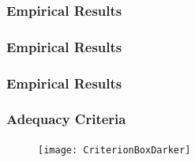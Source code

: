 \begin{frame}%
  \frametitle{Empirical Results}
  \framesubtitle{\mbox{}}
  \begin{center}


\end{center}
\end{frame}

\begin{frame}%
  \frametitle{Empirical Results}
  \framesubtitle{\mbox{}}
  \begin{center}


\end{center}
\end{frame}

\begin{frame}%
  \frametitle{Empirical Results}
  \framesubtitle{\mbox{}}
  \begin{center}


\end{center}
\end{frame}

% 
% 

\begin{frame}[label=current]
  \frametitle{Adequacy Criteria}
  \framesubtitle{\mbox{}}
  \vspace*{-.1in}
  \begin{figure}
    \texttt{[image: CriterionBoxDarker]}
  \end{figure}

  

  \begin{figure}
    \begin{centering}
    \end{centering}
  \end{figure}

\end{frame}

